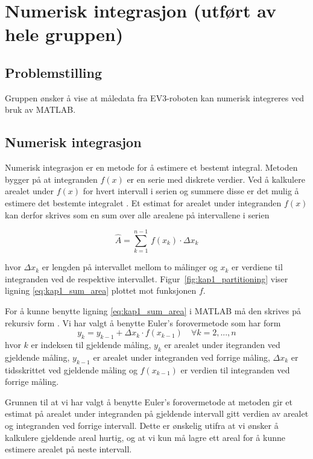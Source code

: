 \documentclass[main.tex]{subfiles}
\begin{document}
\chapter{Numerisk integrasjon (utført av hele gruppen) }\label{kap:integrasjon}

\section{Problemstilling}
Gruppen ønsker å vise at måledata fra \textsc{EV3}-roboten kan numerisk integreres ved bruk av \textsc{MATLAB}.

\section{Numerisk integrasjon}
Numerisk integrasjon er en metode for å estimere et bestemt integral. Metoden bygger på at integranden $f(x)$ er en serie med diskrete verdier. Ved å kalkulere arealet under $f(x)$ for hvert intervall i serien og summere disse er det mulig å estimere det bestemte integralet \parencite[s. 297–301]{AdaEss2017}. Et estimat for arealet under integranden $f(x)$ kan derfor skrives som en sum over alle arealene på intervallene i serien

\begin{equation}\label{eq:kap1_sum_area}
    \hat{A} =\sum_{k=1}^{n-1} \, f(x_k) \cdot \Delta x_k
\end{equation}

hvor $\Delta x_k$ er lengden på intervallet mellom to målinger og $x_k$ er verdiene til integranden ved de respektive intervallet. Figur~\ref{fig:kap1_partitioning} viser ligning \eqref{eq:kap1_sum_area} plottet mot funksjonen $f$.



For å kunne benytte ligning \eqref{eq:kap1_sum_area} i \textsc{MATLAB} må den skrives på rekursiv form \parencite[s.~53–58]{Dre2023Simulink}. Vi har valgt å benytte Euler's forovermetode som har form
\begin{equation}\label{eq:kap1_area_rec}
    y_k = y_{k-1} + \Delta{x_k} \cdot f(x_{k-1}) \quad \forall k=2,..., n
\end{equation}
hvor $k$ er indeksen til gjeldende måling, $y_k$ er arealet under itegranden ved gjeldende måling, $y_{k-1}$ er arealet under integranden ved forrige måling, $\Delta{x_k}$ er tidsskrittet ved gjeldende måling og $f(x_{k-1})$ er verdien til integranden ved forrige måling.

Grunnen til at vi har valgt å benytte Euler's forovermetode at metoden gir et estimat på arealet under integranden på gjeldende intervall gitt verdien av arealet og integranden ved forrige intervall. Dette er ønskelig utifra at vi ønsker å kalkulere gjeldende areal hurtig, og at vi kun må lagre ett areal for å kunne estimere arealet på neste intervall.
\end{document}
